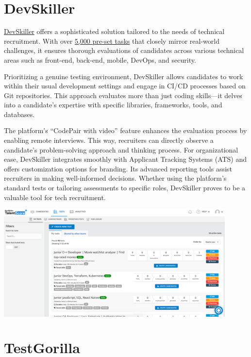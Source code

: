 \documentclass[
]{book}
\begin{document}
\hypertarget{devskiller}{%
\section{DevSkiller}\label{devskiller}}

\href{https://devskiller.com/}{DevSkiller} offers a sophisticated solution tailored to the needs of technical recruitment. With over \href{https://devskiller.com/talentscore/}{5,000 pre-set tasks} that closely mirror real-world challenges, it ensures thorough evaluations of candidates across various technical areas such as front-end, back-end, mobile, DevOps, and security.

Prioritizing a genuine testing environment, DevSkiller allows candidates to work within their usual development settings and engage in CI/CD processes based on Git repositories. This approach evaluates more than just coding skills---it delves into a candidate's expertise with specific libraries, frameworks, tools, and databases.

The platform's ``CodePair with video'' feature enhances the evaluation process by enabling remote interviews. This way, recruiters can directly observe a candidate's problem-solving approach and thinking process. For organizational ease, DevSkiller integrates smoothly with Applicant Tracking Systems (ATS) and offers customization options for branding. Its advanced reporting tools assist recruiters in making well-informed decisions. Whether using the platform's standard tests or tailoring assessments to specific roles, DevSkiller proves to be a valuable tool for tech recruitment.

\includegraphics[width=4.73958in,height=\textheight]{devskiller picc.png}

\hypertarget{testgorilla}{%
\section{TestGorilla}\label{testgorilla}}
\end{document}
